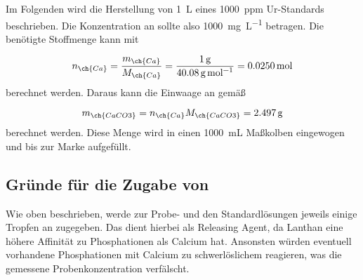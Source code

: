     Im Folgenden wird die Herstellung von \SI[mode=text]{1}{\liter} eines \SI[mode=text]{1000}{ppm}  Ur-Standards beschrieben. Die Konzentration an  sollte also \SI[mode=text]{1000}{\milli\gram\per\liter} betragen. Die benötigte Stoffmenge kann mit 
        
      \begin{equation}
        n_{\ch{Ca}} = \frac{m_{\ch{Ca}}}{M_{\ch{Ca}}} = \frac{\SI[mode=text]{1}{\gram}}{\SI[mode=text]{40.08}{\gram\per\mole}} = \SI[mode=text]{0.0250}{\mole}
      \end{equation}   
    berechnet werden. Daraus kann die Einwaage an  gemäß 
        
      \begin{equation}
        m_{\ch{CaCO3}} = n_{\ch{Ca}} M_{\ch{CaCO3}} = \SI[mode=text]{2.497}{\gram}
      \end{equation}
    berechnet werden. Diese Menge wird in einen \SI[mode=text]{1000}{\milli\liter} Maßkolben eingewogen und bis zur Marke aufgefüllt. 
      
  \subsection{Gründe für die Zugabe von }
    
    Wie oben beschrieben, werde zur Probe- und den Standardlösungen jeweils einige Tropfen an  zugegeben. Das  dient hierbei als Releasing Agent, da Lanthan eine höhere Affinität zu Phosphationen als Calcium hat. Ansonsten würden eventuell vorhandene Phosphationen mit Calcium zu schwerlöslichem  reagieren, was die gemessene Probenkonzentration verfälscht. 
    
    